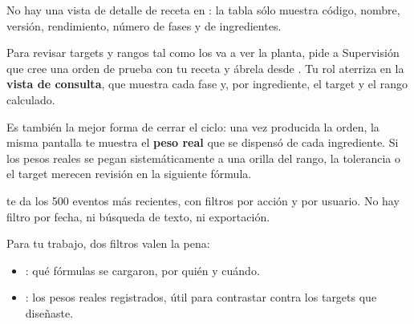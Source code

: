 \newpage
{}

No hay una vista de detalle de receta en : la tabla sólo muestra código,
nombre, versión, rendimiento, número de fases y de ingredientes.


\vspace{6pt}

Para revisar targets y rangos tal como los va a ver la planta, pide a Supervisión que
cree una orden de prueba con tu receta y ábrela desde . Tu rol aterriza
en la \textbf{vista de consulta}, que muestra cada fase y, por ingrediente, el target y
el rango calculado.


\vspace{6pt}

Es también la mejor forma de cerrar el ciclo: una vez producida la orden, la misma
pantalla te muestra el \textbf{peso real} que se dispensó de cada ingrediente. Si los
pesos reales se pegan sistemáticamente a una orilla del rango, la tolerancia o el
target merecen revisión en la siguiente fórmula.


\newpage
{}

 te da los 500 eventos más recientes, con filtros por acción y por
usuario. No hay filtro por fecha, ni búsqueda de texto, ni exportación.


\vspace{6pt}

Para tu trabajo, dos filtros valen la pena:

\begin{itemize}
    \item {}: qué fórmulas se cargaron, por quién y cuándo.
    \item {}: los pesos reales registrados, útil para contrastar contra los
          targets que diseñaste.
\end{itemize}

